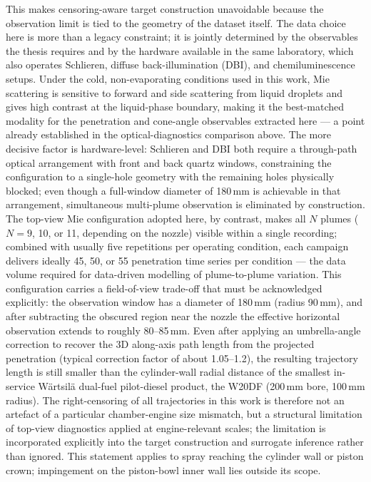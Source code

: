 \documentclass[english, 12pt, a4paper, elec, utf8, a-2b, online]{aaltothesis}
\begin{document}
This makes censoring-aware target construction unavoidable because the observation limit is tied to the geometry of the dataset itself.
The data choice here is more than a legacy constraint; it is jointly determined by the observables the thesis requires and by the hardware available in the same laboratory, which also operates Schlieren, diffuse back-illumination (DBI), and chemiluminescence setups.
Under the cold, non-evaporating conditions used in this work, Mie scattering is sensitive to forward and side scattering from liquid droplets and gives high contrast at the liquid-phase boundary, making it the best-matched modality for the penetration and cone-angle observables extracted here --- a point already established in the optical-diagnostics comparison above.
The more decisive factor is hardware-level: Schlieren and DBI both require a through-path optical arrangement with front and back quartz windows, constraining the configuration to a single-hole geometry with the remaining holes physically blocked; even though a full-window diameter of 180\,mm is achievable in that arrangement, simultaneous multi-plume observation is eliminated by construction.
The top-view Mie configuration adopted here, by contrast, makes all $N$ plumes ($N = 9$, 10, or 11, depending on the nozzle) visible within a single recording; combined with usually five repetitions per operating condition, each campaign delivers ideally 45, 50, or 55 penetration time series per condition --- the data volume required for data-driven modelling of plume-to-plume variation.
This configuration carries a field-of-view trade-off that must be acknowledged explicitly: the observation window has a diameter of 180\,mm (radius 90\,mm), and after subtracting the obscured region near the nozzle the effective horizontal observation extends to roughly 80--85\,mm.
Even after applying an umbrella-angle correction to recover the 3D along-axis path length from the projected penetration (typical correction factor of about 1.05--1.2), the resulting trajectory length is still smaller than the cylinder-wall radial distance of the smallest in-service Wärtsilä dual-fuel pilot-diesel product, the W20DF (200\,mm bore, 100\,mm radius).
The right-censoring of all trajectories in this work is therefore not an artefact of a particular chamber-engine size mismatch, but a structural limitation of top-view diagnostics applied at engine-relevant scales; the limitation is incorporated explicitly into the target construction and surrogate inference rather than ignored.
This statement applies to spray reaching the cylinder wall or piston crown; impingement on the piston-bowl inner wall lies outside its scope.
\end{document}
